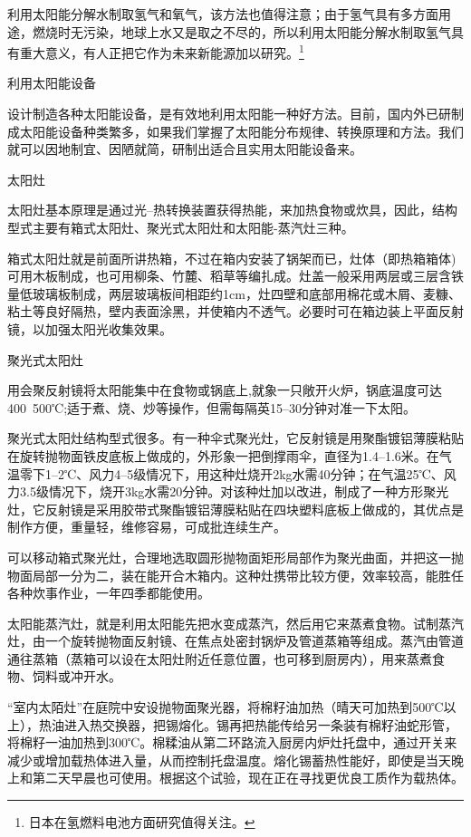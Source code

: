 \documentclass{ctexbook}
\begin{document}
利用太阳能分解水制取氢气和氧气，该方法也值得注意；由于氢气具有多方面用途，燃烧时无污染，地球上水又是取之不尽的，所以利用太阳能分解水制取氢气具有重大意义，有人正把它作为未来新能源加以研究。\footnote{日本在氢燃料电池方面研究值得关注。}

利用太阳能设备

设计制造各种太阳能设备，是有效地利用太阳能一种好方法。目前，国内外已研制成太阳能设备种类繁多，如果我们掌握了太阳能分布规律、转换原理和方法。我们就可以因地制宜、因陋就简，研制出适合且实用太阳能设备来。

太阳灶

太阳灶基本原理是通过光--热转换装置获得热能，来加热食物或炊具，因此，结构型式主要有箱式太阳灶、聚光式太阳灶和太阳能-蒸汽灶三种。

箱式太阳灶就是前面所讲热箱，不过在箱内安装了锅架而已，灶体（即热箱箱体)可用木板制成，也可用柳条、竹麓、稻草等编扎成。灶盖一般采用两层或三层含铁量低玻璃板制成，两层玻璃板间相距约1cm，灶四壁和底部用棉花或木屑、麦糠、粘土等良好隔热，壁内表面涂黑，并使箱内不透气。必要时可在箱边装上平面反射镜，以加强太阳光收集效果。

聚光式太阳灶

用会聚反射镜将太阳能集中在食物或锅底上,就象一只敞开火炉，锅底温度可达400~500℃;适于煮、烧、炒等操作，但需每隔英15--30分钟对准一下太阳。

聚光式太阳灶结构型式很多。有一种伞式聚光灶，它反射镜是用聚酯镀铝薄膜粘贴在旋转抛物面铁皮底板上做成的，外形象一把倒撑雨伞，直径为1.4--1.6米。在气温零下1--2℃、风力4--5级情况下，用这种灶烧开2kg水需40分钟；在气温25℃、风力3.5级情况下，烧开3kg水需20分钟。对该种灶加以改进，制成了一种方形聚光灶，它反射镜是采用胶带式聚酯镀铝薄膜粘贴在四块塑料底板上做成的，其优点是制作方便，重量轻，维修容易，可成批连续生产。

可以移动箱式聚光灶，合理地选取圆形抛物面矩形局部作为聚光曲面，并把这一抛物面局部一分为二，装在能开合木箱内。这种灶携带比较方便，效率较高，能胜任各种炊事作业，一年四季都能使用。

太阳能蒸汽灶，就是利用太阳能先把水变成蒸汽，然后用它来蒸煮食物。试制蒸汽灶，由一个旋转抛物面反射镜、在焦点处密封锅炉及管道蒸箱等组成。蒸汽由管道通往蒸箱（蒸箱可以设在太阳灶附近任意位置，也可移到厨房内），用来蒸煮食物、饲料或冲开水。


“室内太陌灶”在庭院中安设抛物面聚光器，将棉籽油加热（晴天可加热到500℃以上），热油进入热交换器，把锡熔化。锡再把热能传给另一条装有棉籽油蛇形管，将棉籽一油加热到300℃。棉糅油从第二环路流入厨房内炉灶托盘中，通过开关来减少或增加载热体进入量，从而控制托盘温度。熔化锡蓄热性能好，即使是当天晚上和第二天早晨也可使用。根据这个试验，现在正在寻找更优良工质作为载热体。
\end{document}
